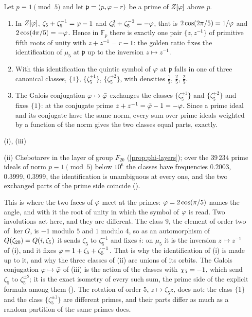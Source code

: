 \begin{proposition}\label{prop:phi-names-mu5}
Let $p\equiv1\pmod5$ and let $\mathfrak p=(p,\varphi-r)$ be a prime of $Z[\varphi]$ above $p$.
\begin{enumerate}[label=\textup{(\roman*)}]
  \item In $Z[\varphi]$, $\zeta_5+\zeta_5^{-1}=\varphi-1$ and $\zeta_5^2+\zeta_5^{-2}=-\varphi$, that is
    $2\cos(2\pi/5)=1/\varphi$ and $2\cos(4\pi/5)=-\varphi$.  Hence in $\mathbb F_p$ there is exactly one
    pair $\{z,z^{-1}\}$ of primitive fifth roots of unity with $z+z^{-1}=r-1$: the golden ratio fixes
    the identification of $\mu_5$ at $\mathfrak p$ up to the inversion $z\mapsto z^{-1}$.
  \item With this identification the quintic symbol of $\varphi$ at $\mathfrak p$ falls in one of three
    canonical classes, $\{1\}$, $\{\zeta_5^{\pm1}\}$, $\{\zeta_5^{\pm2}\}$, with densities $\tfrac15$,
    $\tfrac25$, $\tfrac25$.
  \item The Galois conjugation $\varphi\mapsto\bar{\varphi}$ exchanges the classes $\{\zeta_5^{\pm1}\}$ and
    $\{\zeta_5^{\pm2}\}$ and fixes $\{1\}$: at the conjugate prime $z+z^{-1}=\bar{\varphi}-1=-\varphi$.
    Since a prime ideal and its conjugate have the same norm, every sum over prime ideals weighted by a
    function of the norm gives the two classes equal parts, exactly.
\end{enumerate}
\end{proposition}
(i), (iii)

(ii) Chebotarev in the layer of group $F_{20}$
(\cref{prop:phi-layers}); over the $39\,234$ prime ideals of norm $p\equiv1\pmod5$ below $10^6$
the classes have frequencies $0.2003$, $0.3999$, $0.3999$, the identification is unambiguous at every one,
and the two exchanged parts of the prime side coincide ().

This is where the two faces of $\varphi$ meet at the primes: $\varphi=2\cos(\pi/5)$ names the angle, and
with it the root of unity in which the symbol of $\varphi$ is read.  Two involutions act here, and they are
different.  The class $9$, the element of order two of $\ker G$, is $-1$ modulo $5$ and $1$ modulo $4$, so as an
automorphism of $Q(\zeta_{20})=Q(i,\zeta_5)$ it sends $\zeta_5$ to $\zeta_5^{-1}$ and fixes $i$: on $\mu_5$ it is
the inversion $z\mapsto z^{-1}$ of (i), and it fixes $\varphi=1+\zeta_5+\zeta_5^{-1}$.  That is why the
identification of (i) is made up to it, and why the three classes of (ii) are unions of its orbits.  The Galois
conjugation $\varphi\mapsto\bar{\varphi}$ of (iii) is the action of the classes with $\chi_5=-1$, which send $\zeta_5$
to $\zeta_5^{\pm2}$; it is the exact isometry of every such sum, the prime side of the explicit formula among
them ().  The rotation of order $5$, $z\mapsto\zeta_5z$, does not: the class
$\{1\}$ and the class $\{\zeta_5^{\pm1}\}$ are different primes, and their parts differ as much as a
random partition of the same primes does.

